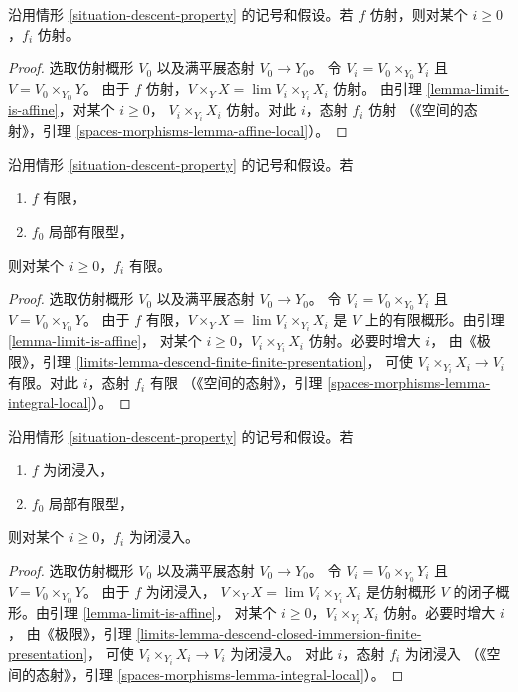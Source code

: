 \begin{lemma}
\label{lemma-descend-affine}
沿用情形 \ref{situation-descent-property} 的记号和假设。若
$f$ 仿射，则对某个 $i \geq 0$，$f_i$ 仿射。
\end{lemma}

\begin{proof}
选取仿射概形 $V_0$ 以及满平展态射 $V_0 \to Y_0$。
令 $V_i = V_0 \times_{Y_0} Y_i$ 且 $V = V_0 \times_{Y_0} Y$。
由于 $f$ 仿射，$V \times_Y X = \lim V_i \times_{Y_i} X_i$ 仿射。
由引理 \ref{lemma-limit-is-affine}，对某个 $i \geq 0$，
$V_i \times_{Y_i} X_i$ 仿射。对此 $i$，态射 $f_i$ 仿射
（《空间的态射》，引理 \ref{spaces-morphisms-lemma-affine-local}）。
\end{proof}

\begin{lemma}
\label{lemma-descend-finite}
沿用情形 \ref{situation-descent-property} 的记号和假设。若
\begin{enumerate}
\item $f$ 有限，
\item $f_0$ 局部有限型，
\end{enumerate}
则对某个 $i \geq 0$，$f_i$ 有限。
\end{lemma}

\begin{proof}
选取仿射概形 $V_0$ 以及满平展态射 $V_0 \to Y_0$。
令 $V_i = V_0 \times_{Y_0} Y_i$ 且 $V = V_0 \times_{Y_0} Y$。
由于 $f$ 有限，$V \times_Y X = \lim V_i \times_{Y_i} X_i$
是 $V$ 上的有限概形。由引理 \ref{lemma-limit-is-affine}，
对某个 $i \geq 0$，$V_i \times_{Y_i} X_i$ 仿射。必要时增大 $i$，
由《极限》，引理 \ref{limits-lemma-descend-finite-finite-presentation}，
可使 $V_i \times_{Y_i} X_i \to V_i$ 有限。对此 $i$，态射 $f_i$ 有限
（《空间的态射》，引理 \ref{spaces-morphisms-lemma-integral-local}）。
\end{proof}

\begin{lemma}
\label{lemma-descend-closed-immersion}
沿用情形 \ref{situation-descent-property} 的记号和假设。若
\begin{enumerate}
\item $f$ 为闭浸入，
\item $f_0$ 局部有限型，
\end{enumerate}
则对某个 $i \geq 0$，$f_i$ 为闭浸入。
\end{lemma}

\begin{proof}
选取仿射概形 $V_0$ 以及满平展态射 $V_0 \to Y_0$。
令 $V_i = V_0 \times_{Y_0} Y_i$ 且 $V = V_0 \times_{Y_0} Y$。
由于 $f$ 为闭浸入，
$V \times_Y X = \lim V_i \times_{Y_i} X_i$
是仿射概形 $V$ 的闭子概形。由引理 \ref{lemma-limit-is-affine}，
对某个 $i \geq 0$，$V_i \times_{Y_i} X_i$ 仿射。必要时增大 $i$，
由《极限》，引理
\ref{limits-lemma-descend-closed-immersion-finite-presentation}，
可使 $V_i \times_{Y_i} X_i \to V_i$ 为闭浸入。
对此 $i$，态射 $f_i$ 为闭浸入
（《空间的态射》，引理 \ref{spaces-morphisms-lemma-integral-local}）。
\end{proof}

